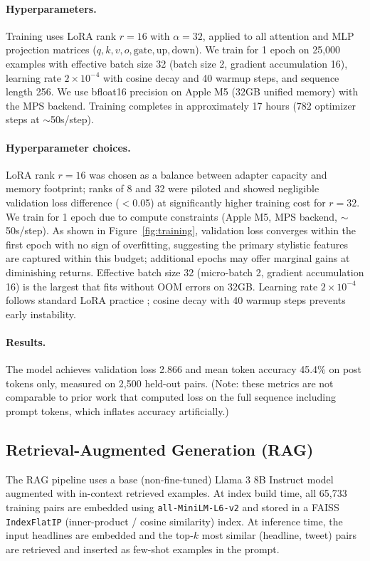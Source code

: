 \documentclass[11pt,a4paper]{article}
\begin{document}
\paragraph{Hyperparameters.}
Training uses LoRA rank $r=16$ with $\alpha=32$, applied to all attention and MLP projection matrices ($q, k, v, o, \text{gate}, \text{up}, \text{down}$). We train for 1 epoch on 25,000 examples with effective batch size 32 (batch size 2, gradient accumulation 16), learning rate $2\times10^{-4}$ with cosine decay and 40 warmup steps, and sequence length 256. We use bfloat16 precision on Apple M5 (32GB unified memory) with the MPS backend. Training completes in approximately 17 hours (782 optimizer steps at $\sim$50s/step).

\paragraph{Hyperparameter choices.}
LoRA rank $r=16$ was chosen as a balance between adapter capacity and memory footprint; ranks of 8 and 32 were piloted and showed negligible validation loss difference ($<$0.05) at significantly higher training cost for $r=32$. We train for 1 epoch due to compute constraints (Apple M5, MPS backend, $\sim$50s/step). As shown in Figure~\ref{fig:training}, validation loss converges within the first epoch with no sign of overfitting, suggesting the primary stylistic features are captured within this budget; additional epochs may offer marginal gains at diminishing returns. Effective batch size 32 (micro-batch 2, gradient accumulation 16) is the largest that fits without OOM errors on 32GB. Learning rate $2\times10^{-4}$ follows standard LoRA practice \citep{hu2022lora}; cosine decay with 40 warmup steps prevents early instability.

\paragraph{Results.}
The model achieves validation loss 2.866 and mean token accuracy 45.4\% on post tokens only, measured on 2,500 held-out pairs. (Note: these metrics are not comparable to prior work that computed loss on the full sequence including prompt tokens, which inflates accuracy artificially.)

\subsection{Retrieval-Augmented Generation (RAG)}

The RAG pipeline uses a base (non-fine-tuned) Llama 3 8B Instruct model augmented with in-context retrieved examples. At index build time, all 65,733 training pairs are embedded using \texttt{all-MiniLM-L6-v2} and stored in a FAISS \texttt{IndexFlatIP} (inner-product / cosine similarity) index. At inference time, the input headlines are embedded and the top-$k$ most similar (headline, tweet) pairs are retrieved and inserted as few-shot examples in the prompt.
\end{document}
